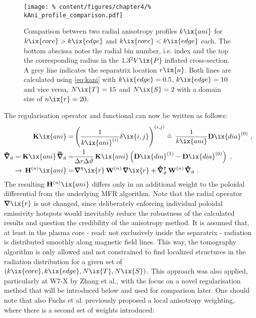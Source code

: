 %
            \begin{figure}[t]%
                \centering%
                \texttt{[image: \%
                    content/figures/chapter4/\%
                    kAni\_profile\_comparison.pdf]}%
                \caption{Comparison between two radial anisotropy profiles $k\ix{ani}$ for $k\ix{core}>k\ix{edge}$ and $k\ix{core}<k\ix{edge}$ each. The bottom abscissa notes the radial bin number, i.e. index and the top the corresponding radius in the $1.3^{2}V\ix{P}$ inflated cross-section. A grey line indicates the separatrix location $r\ix{a}$. Both lines are calculated using \cref{eq:kani} with $k\ix{edge}=0.5$, $k\ix{edge}=10$ and vice versa, $N\ix{T}=15$ and $N\ix{S}=2$ with a domain size of $n\ix{r}=20$.}\label{fig:kanicomparison}%
            \end{figure}%
%
            The regularisation operator and functional can now be written as follows:%
%
            \begin{align}%
                \begin{split}%
                    \mathbf{K}\ix{ani}=&\left(\frac{1}{k\ix{ani}^{\left(i\right)}}\delta\ix{i,j}\right)^{\left(i,j\right)}\mathrel{\hat{=}}\,\frac{1}{k\ix{ani}}\mathbf{D}\ix{dia}^{\left(0\right)}\,\,,\\%
                    \pmb{\hat{\nabla}}_{\vartheta}=\mathbf{K}\ix{ani}\,\pmb{\widetilde{\nabla}}_{\vartheta}=&\frac{1}{\Delta r\Delta\vartheta}\,\mathbf{K}\ix{ani}\left(\mathbf{D}\ix{dia}^{\left(1\right)}-\mathbf{D}\ix{dia}^{\left(0\right)}\right)\,\,,\\%
                    \to\,\mathbf{H}^{\left(n\right)}\ix{ani}=&\,\pmb{\nabla}^{\intercal}\ix{r}\,\mathbf{W}^{\left(n\right)}\,\pmb{\nabla}\ix{r}+\pmb{\hat{\nabla}}^{\intercal}_{\vartheta}\,\mathbf{W}^{\left(n\right)}\,\pmb{\hat{\nabla}}_{\vartheta}\,\,.%
                \end{split}\label{eq:anisotropy}%
            \end{align}%
%
            The resulting $\mathbf{H}^{\left(n\right)}\ix{ani}$ differs only in an additional weight to the poloidal differential from the underlying MFR algorithm. Note that the radial operator $\pmb{\nabla}\ix{r}$ is not changed, since deliberately enforcing individual poloidal emissivity hotspots would inevitably reduce the robustness of the calculated results and question the credibility of the anisotropy method. It is assumed that, at least in the plasma core - read: not exclusively inside the separatrix - radiation is distributed smoothly along magnetic field lines. This way, the tomography algorithm is only allowed and not constrained to find localized structures in the radiation distribution for a given set of $\left(k\ix{core},k\ix{edge},N\ix{T},N\ix{S}\right)$. This approach was also applied, particularly at W7-X by Zhang et al.\cite{Zhang2021_2}, with the focus on a novel regularisation method that will be introduced below and used for comparison later. One should note that also Fuchs et al.\cite{Fuchs1994} previously proposed a local anisotropy weighting, where there is a second set of weights introduced:%
